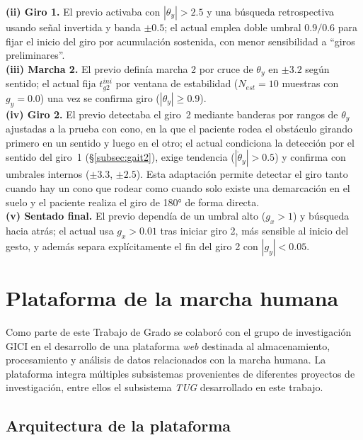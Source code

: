 \documentclass[12pt]{report}
\begin{document}
\begin{justify}
    \textbf{(ii) Giro 1.} El previo activaba con $|\theta_y|>2.5$ y una búsqueda retrospectiva usando señal invertida y banda $\pm 0.5$; el actual emplea doble umbral $0.9/0.6$ para fijar el inicio del giro por acumulación sostenida, con menor sensibilidad a ``giros preliminares''.\\

    \textbf{(iii) Marcha 2.} El previo definía marcha 2 por cruce de $\theta_y$ en $\pm 3.2$ según sentido; el actual fija $t_{g2}^{ini}$ por ventana de estabilidad ($N_{est}=10$ muestras con $g_y=0.0$) una vez se confirma giro ($|\theta_y|\ge 0.9$).\\

    \textbf{(iv) Giro 2.} El previo detectaba el giro~2 mediante banderas por rangos de $\theta_y$ ajustadas a la prueba con cono, en la que el paciente rodea el obstáculo girando primero en un sentido y luego en el otro; el actual condiciona la detección por el sentido del giro~1 (§\ref{subsec:gait2}), exige tendencia ($|\dot{\theta}_y|>0.5$) y confirma con umbrales internos ($\pm 3.3$, $\pm 2.5$). Esta adaptación permite detectar el giro tanto cuando hay un cono que rodear como cuando solo existe una demarcación en el suelo y el paciente realiza el giro de 180° de forma directa.\\

    \textbf{(v) Sentado final.} El previo dependía de un umbral alto ($g_x>1$) y búsqueda hacia atrás; el actual usa $g_x>0.01$ tras iniciar giro 2, más sensible al inicio del gesto, y además separa explícitamente el fin del giro 2 con $|g_y|<0.05$.\\




    \section{Plataforma de la marcha humana}
    \label{sec:gait-platform}

    Como parte de este Trabajo de Grado se colaboró con el grupo de investigación GICI en el desarrollo de una plataforma \textit{web} destinada al almacenamiento, procesamiento y análisis de datos relacionados con la marcha humana. La plataforma integra múltiples subsistemas provenientes de diferentes proyectos de investigación, entre ellos el subsistema \textit{TUG} desarrollado en este trabajo.

    \subsection{Arquitectura de la plataforma}


\end{justify}
\end{document}
